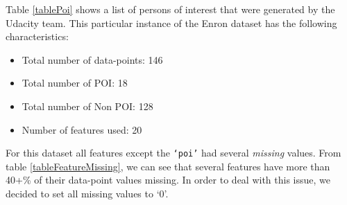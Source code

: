 \documentclass[twoside,openright,titlepage,numbers=noenddot,headinclude,%
               footinclude=true,cleardoublepage=empty,abstractoff,BCOR=5mm,%
               paper=a4,fontsize=11pt,ngerman,american]{scrreprt}
\numberwithin{theorem}{chapter}
\numberwithin{definition}{chapter}
\numberwithin{algorithm}{chapter}
\numberwithin{figure}{chapter}
\numberwithin{table}{chapter}
\numberwithin{equation}{chapter}
\begin{document}
Table \ref{tablePoi} shows a list of persons of interest that were generated by the Udacity team. This particular instance of the Enron dataset has the following characteristics:
\begin{itemize}
    \item Total number of data-points: 146
    \item Total number of POI: 18
    \item Total number of Non POI: 128
    \item Number of features used: 20
\end{itemize} 
For this dataset all features except the \texttt{`poi'} had several \textit{missing} values. From table \ref{tableFeatureMissing}, we can see that several features have more than 40+\% of their data-point values missing. In order to deal with this issue, we decided to set all missing values to `0'. 
\end{document}
